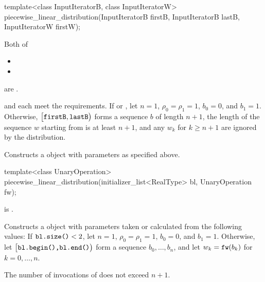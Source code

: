 \begin{itemdecl}
template<class InputIteratorB, class InputIteratorW>
  piecewise_linear_distribution(InputIteratorB firstB, InputIteratorB lastB,
                                InputIteratorW firstW);
\end{itemdecl}

\begin{itemdescr}
\pnum
\mandates
Both of
\begin{itemize}
\item{}
\item{}
\end{itemize}
are .

\pnum
\expects
   and 
   each meet the
   requirements.
 If 
 or ,
 let $n = 1$,
     $\rho_0 = \rho_1 = 1$,
     $b_0 = 0$,
 and $b_1 = 1$.
 Otherwise,
 $\bigl[\tcode{firstB}, \tcode{lastB}\bigr)$
 forms a sequence $b$ of length $n+1$,
 the length of the sequence $w$ starting from 
 is at least $n+1$,
 and any $w_k$ for $k \geq n + 1$ are ignored by the distribution.

\pnum
\effects
Constructs a  object
 with parameters as specified above.
\end{itemdescr}


%
\begin{itemdecl}
template<class UnaryOperation>
  piecewise_linear_distribution(initializer_list<RealType> bl, UnaryOperation fw);
\end{itemdecl}

\begin{itemdescr}
\pnum
\mandates
{} is .

\pnum
\effects
Constructs a  object
 with parameters taken or calculated
 from the following values:
 If $\tcode{bl.size()} < 2$,
 let $n = 1$,
     $\rho_0 = \rho_1 = 1$,
     $b_0 = 0$,
 and $b_1 = 1$.
 Otherwise,
 let $\bigl[\tcode{bl.begin(),} \tcode{bl.end()}\bigr)$
 form a sequence $b_0, \dotsc, b_n$,
 and
 let $w_k = \tcode{fw}(b_k)$
 for $k = 0, \dotsc, n$.

\pnum
\complexity
The number of invocations of  does not exceed $n+1$.
\end{itemdescr}


